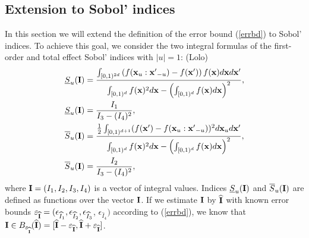 \subsection{Extension to Sobol' indices}
\label{sec:3.2}
In this section we will extend the definition of the error bound (\ref{errbd}) to Sobol' indices. To achieve this goal, we consider the two integral formulas of the first-order and total effect Sobol' indices with $|u|=1$:
{\color{purple}(Lolo)
\begin{align*}
\underline{S}_u(\vI) & = \frac{\int_{[0,1)^{2d}} \left(f(\vx_u:{\vx'}_{-u})-f(\vx')\right)f(\vx)d\vx d{\vx'}}{\int_{[0,1)^{d}} f(\vx)^2 d{\vx}-\left(\int_{[0,1)^{d}} f(\vx) d{\vx}\right)^2}, \\ 
\underline{S}_u(\vI) & = \frac{I_1}{I_3-(I_4)^2}, \\
\overline{S}_u(\vI) & = \frac{\frac{1}{2}\int_{[0,1)^{d+1}}(f(\vx')-f(\vx_u:{\vx'}_{-u}))^2d\vx_u d{\vx'}}{\int_{[0,1)^{d}} f(\vx)^2 d{\vx}-\left(\int_{[0,1)^{d}} f(\vx) d{\vx}\right)^2}, \\
\overline{S}_u(\vI) & = \frac{I_2}{I_3-(I_4)^2},
\end{align*}
}
where $\vI=(I_1,I_2,I_3,I_4)$ is a vector of integral values. Indices $\underline{S}_u(\vI)$ and $\overline{S}_u(\vI)$ are defined as functions over the vector $\vI$. If we estimate $\vI$ by $\widehat{\vI}$ with known error bounds $\varepsilon_{\widehat{\vI}}=(\epsilon_{\widehat{I}_1},\epsilon_{\widehat{I}_2},\epsilon_{\widehat{I}_3}$, $\epsilon_{\widehat{I}_4})$ according to (\ref{errbd}), we know that $\vI\in B_{\varepsilon_{\widehat{\vI}}}(\widehat{\vI})=[\widehat{\vI}-\varepsilon_{\widehat{\vI}},\widehat{\vI}+\varepsilon_{\widehat{\vI}} ]$. 

